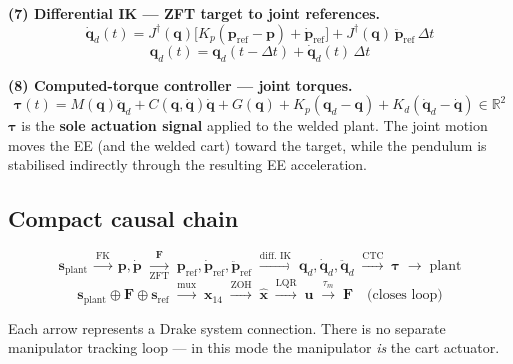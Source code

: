 \documentclass[11pt, a4paper]{article}
\begin{document}
\bigskip
\noindent\textbf{(7) Differential IK — ZFT target to joint references.}
\[
\dot{\bm{q}}_d(t)
= J^{\dagger}(\bm{q})\bigl[K_p(\bm{p}_{\mathrm{ref}} - \bm{p})
+ \dot{\bm{p}}_{\mathrm{ref}}\bigr]
+ J^{\dagger}(\bm{q})\,\ddot{\bm{p}}_{\mathrm{ref}}\,\Delta t
\]
\[
\bm{q}_d(t) = \bm{q}_d(t{-}\Delta t) + \dot{\bm{q}}_d(t)\,\Delta t
\]

\bigskip
\noindent\textbf{(8) Computed-torque controller — joint torques.}
\[
\bm{\tau}(t)
= M(\bm{q})\ddot{\bm{q}}_d
+ C(\bm{q},\dot{\bm{q}})\dot{\bm{q}}
+ G(\bm{q})
+ K_p(\bm{q}_d - \bm{q})
+ K_d(\dot{\bm{q}}_d - \dot{\bm{q}})
\in\mathbb{R}^{2}
\]
$\bm{\tau}$ is the \textbf{sole actuation signal} applied to the welded plant.
The joint motion moves the EE (and the welded cart) toward the target, while
the pendulum is stabilised indirectly through the resulting EE acceleration.

\subsection*{Compact causal chain}

\[
\bm{s}_{\mathrm{plant}}
\;\xrightarrow{\text{FK}}\;
\bm{p}, \dot{\bm{p}}
\;\xrightarrow[\text{ZFT}]{\bm{F}}\;
\bm{p}_{\mathrm{ref}},\dot{\bm{p}}_{\mathrm{ref}},\ddot{\bm{p}}_{\mathrm{ref}}
\;\xrightarrow{\text{diff.\ IK}}\;
\bm{q}_d, \dot{\bm{q}}_d, \ddot{\bm{q}}_d
\;\xrightarrow{\text{CTC}}\;
\bm{\tau}
\;\longrightarrow\;
\text{plant}
\]
\[
\bm{s}_{\mathrm{plant}} \oplus \bm{F} \oplus \bm{s}_{\mathrm{ref}}
\;\xrightarrow{\text{mux}}\;
\bm{x}_{14}
\;\xrightarrow{\text{ZOH}}\;
\hat{\bm{x}}
\;\xrightarrow{\text{LQR}}\;
\bm{u}
\;\xrightarrow{\tau_m}\;
\bm{F}
\quad\text{(closes loop)}
\]

\noindent Each arrow represents a Drake system connection.  There is no
separate manipulator tracking loop — in this mode the manipulator \emph{is}
the cart actuator.
\end{document}
